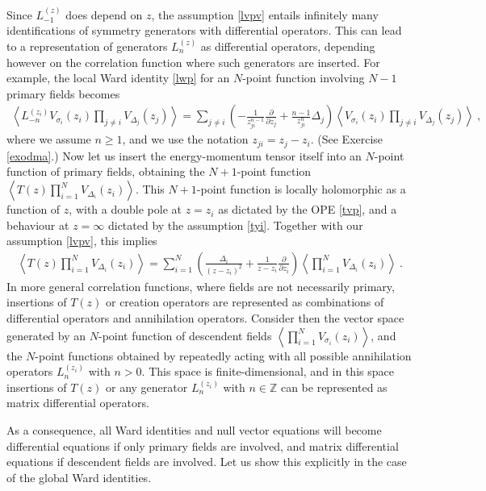 \documentclass[12pt,a4paper,notitlepage]{report}
\numberwithin{equation}{section}
\theoremstyle{break}
\begin{document}
Since $L_{-1}^{(z)}$ does depend on $z$, the assumption \eqref{lvpv} entails infinitely many identifications of symmetry generators with differential operators.
This can lead to a representation of generators $L_n^{(z)}$ as differential operators, depending however on the correlation function where such generators are inserted.
For example, the local Ward identity \eqref{lwp} for an $N$-point function involving $N-1$ primary fields becomes
\begin{align}
 \boxed{\left\langle L_{-n}^{(z_i)}V_{\sigma_i}(z_i)\prod_{j\neq i} V_{\Delta_j}(z_j) \right\rangle =
\sum_{j\neq i} \left(-\frac{1}{z_{ji}^{n-1}} {\frac{\partial}{\partial z_j}}  + \frac{n-1}{z_{ji}^n} \Delta_j\right)
\left\langle V_{\sigma_i}(z_i)\prod_{j\neq i} V_{\Delta_j}(z_j) \right\rangle} \ ,
\label{lmn}
\end{align}
where we assume $n\geq 1$, and we use the notation $z_{ji}=z_j-z_i$. (See Exercise \ref{exodma}.)
Now let us insert the energy-momentum tensor itself into an $N$-point function of primary fields, obtaining the $N+1$-point function $
\left\langle T(z) \prod_{i=1}^N V_{\Delta_i}(z_i)\right\rangle$.
This $N+1$-point function is locally holomorphic as a function of $z$, with a double pole at $z=z_i$ as dictated by the OPE \eqref{tvp}, and a behaviour at $z=\infty$ dictated by the assumption \eqref{tyi}.
Together with our assumption \eqref{lvpv}, this implies 
\begin{align}
 \boxed{\left\langle T(z) \prod_{i=1}^N V_{\Delta_i}(z_i)\right\rangle = \sum_{i=1}^N \left(\frac{\Delta_i}{(z-z_i)^2} + \frac{1}{z-z_i}{\frac{\partial}{\partial z_i}}\right)\left\langle  \prod_{i=1}^N V_{\Delta_i}(z_i)\right\rangle }\ .
\label{dtz}
\end{align}
In more general correlation functions, where fields are not necessarily primary, insertions of $T(z)$ or creation operators are represented as combinations of differential operators and annihilation operators.
Consider then the vector space generated by an $N$-point function of descendent fields $\left\langle \prod_{i=1}^NV_{\sigma_i}(z_i)\right\rangle$, and the $N$-point functions obtained by repeatedly acting with all possible annihilation operators $L_n^{(z_i)}$ with $n>0$.
This space is finite-dimensional, and in this space insertions of $T(z)$ or 
any generator $L_n^{(z_i)}$ with $n\in {\mathbb{Z}}$ can be represented as matrix differential operators. 

As a consequence, all Ward identities and null vector equations will become differential equations if only primary fields are involved, and matrix differential equations if descendent fields are involved.
Let us show this explicitly in the case of the global Ward identities.
\end{document}
